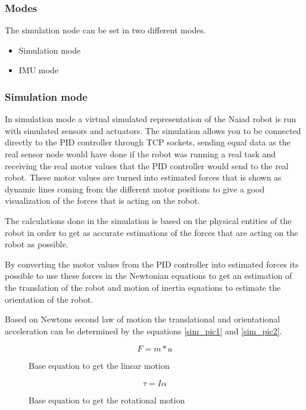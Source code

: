 	\subsubsection*{Modes}
		\noindent
		The simulation node can be set in two different modes.
		\begin{itemize}
  			\item Simulation mode
  			\item IMU mode
		\end{itemize}
	\subsubsection*{Simulation mode}
		\noindent
		In simulation mode a virtual simulated representation of the Naiad robot is run with simulated sensors and actuators. The simulation allows you to be connected directly to the PID controller through TCP sockets, sending equal data as the real sensor node would have done if the robot was running a real task and receiving the real motor values that the PID controller would send to the real robot. These motor values are turned into estimated forces that is shown as dynamic lines coming from the different motor positions to give a good visualization of the forces that is acting on the robot.
		
		The calculations done in the simulation is based on the physical entities of the robot in order to get as accurate estimations of the forces that are acting on the robot as possible.
		
		By converting the motor values from the PID controller into estimated forces its possible to use these forces in the Newtonian equations to get an estimation of the translation of the robot and motion of inertia equations to estimate the orientation of the robot.
		
		Based on Newtons second law of motion the translational and orientational acceleration can be determined by the equations \ref{sim_pic1} and \ref{sim_pic2}.
		
		\begin{center}
		\begin{figure}[!ht]
		\begin{equation}\label{sim_pic1}
		F=m*a		
		\end{equation}	
		\caption{Base equation to get the linear motion}
		\begin{equation}\label{sim_pic2}
		\tau =I\alpha
		\end{equation}
		\caption{Base equation to get the rotational motion}
		\end{figure}
		\end{center}
		


